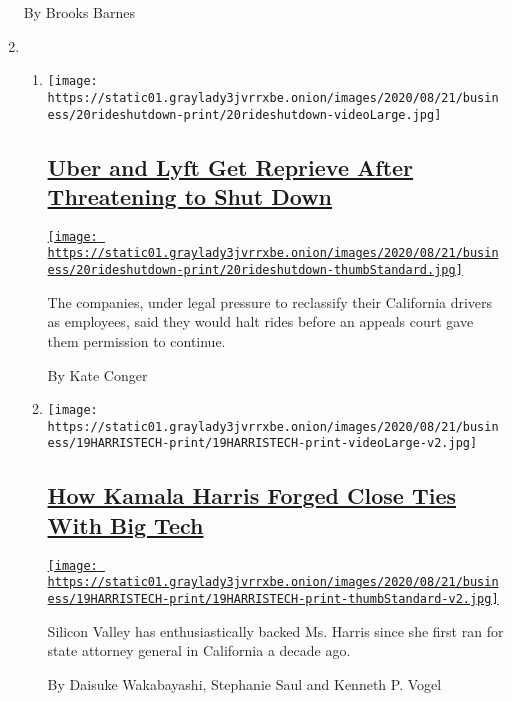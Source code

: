 \begin{enumerate}
  By Brooks Barnes
\item
  \begin{enumerate}
  \def\labelenumii{\arabic{enumii}.}
  \item
    \texttt{[image: https://static01.graylady3jvrrxbe.onion/images/2020/08/21/business/20rideshutdown-print/20rideshutdown-videoLarge.jpg]}

    \hypertarget{uber-and-lyft-get-reprieve-after-threatening-to-shut-down}{%
    \subsection{\texorpdfstring{\href{/2020/08/20/technology/uber-lyft-california-shutdown.html}{Uber
    and Lyft Get Reprieve After Threatening to Shut
    Down}}{Uber and Lyft Get Reprieve After Threatening to Shut Down}}\label{uber-and-lyft-get-reprieve-after-threatening-to-shut-down}}

    \href{/2020/08/20/technology/uber-lyft-california-shutdown.html}{\texttt{[image: https://static01.graylady3jvrrxbe.onion/images/2020/08/21/business/20rideshutdown-print/20rideshutdown-thumbStandard.jpg]}}

    The companies, under legal pressure to reclassify their California
    drivers as employees, said they would halt rides before an appeals
    court gave them permission to continue.

    By Kate Conger
  \item
    \texttt{[image: https://static01.graylady3jvrrxbe.onion/images/2020/08/21/business/19HARRISTECH-print/19HARRISTECH-print-videoLarge-v2.jpg]}

    \hypertarget{how-kamala-harris-forged-close-ties-with-big-tech}{%
    \subsection{\texorpdfstring{\href{/2020/08/20/technology/kamala-harris-ties-to-big-tech.html}{How
    Kamala Harris Forged Close Ties With Big
    Tech}}{How Kamala Harris Forged Close Ties With Big Tech}}\label{how-kamala-harris-forged-close-ties-with-big-tech}}

    \href{/2020/08/20/technology/kamala-harris-ties-to-big-tech.html}{\texttt{[image: https://static01.graylady3jvrrxbe.onion/images/2020/08/21/business/19HARRISTECH-print/19HARRISTECH-print-thumbStandard-v2.jpg]}}

    Silicon Valley has enthusiastically backed Ms. Harris since she
    first ran for state attorney general in California a decade ago.

    By Daisuke Wakabayashi, Stephanie Saul and Kenneth P. Vogel
  \end{enumerate}
\end{enumerate}

